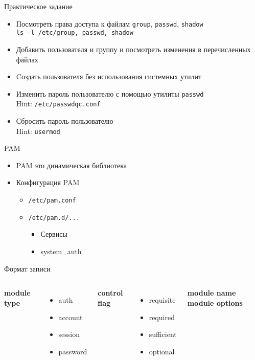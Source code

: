 \documentclass[ignorenonframetext, professionalfonts, hyperref={pdftex, unicode}]{beamer}
\begin{document}
\begin{frame}{Практическое задание}
    \begin{itemize}
		\item Посмотреть права доступа к файлам {\tt group}, {\tt passwd}, {\tt shadow}\\
			{\tt ls -l /etc/{group, passwd, shadow}}
		\item Добавить пользователя и группу и посмотреть изменения в перечисленных файлах
		\item Cоздать пользователя без использования системных утилит
    \end{itemize}
	\pause
	 \begin{itemize}
		\item Изменить пароль пользователю с помощью утилиты {\tt passwd}\\
			Hint: {\tt /etc/passwdqc.conf}
		\item Сбросить пароль пользователю\\
			Hint: {\tt usermod}
    \end{itemize}
\end{frame}


\begin{frame}{PAM}
	\begin{itemize}
		\item PAM это динамическая библиотека
		\item Конфигурация PAM
			\begin{itemize}
				\item {\tt /etc/pam.conf}
				\item {\tt /etc/pam.d/...}
					\begin{itemize}
						\item Сервисы
						\item system\_auth
					\end{itemize}
			\end{itemize}
	\end{itemize}

	\begin{block}{Формат записи}
		\begin{columns}
			\textbf{module type}
			 \begin{itemize}
				 \item auth
				 \item account
				 \item session
				 \item password
			 \end{itemize}
			 \textbf{control flag}
			 \begin{itemize}
				 \item requisite
				 \item required
				 \item sufficient
				 \item optional
			 \end{itemize}
			 \textbf{module name}
			 \textbf{module options}
		 \end{columns}
	 \end{block}
\end{frame}
\end{document}
